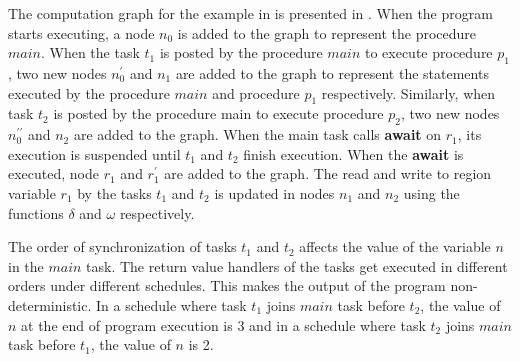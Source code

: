 The computation graph for the example in  is presented in . When the program starts executing, a node $n_0$ is added to the graph to represent the procedure $main$. When the task $t_1$ is posted by the procedure $main$ to execute procedure $p_1$, two new nodes $n_0^\prime$ and $n_1$ are added to the graph to represent the statements executed by the procedure $main$ and procedure $p_1$ respectively. Similarly, when task $t_2$ is posted by the procedure main to execute procedure $p_2$, two new nodes $n_0^{\prime\prime}$ and $n_2$ are added to the graph. When the main task calls \textbf{await} on $r_1$, its execution is suspended until $t_1$ and $t_2$ finish execution. When the \textbf{await} is executed, node $r_1$ and $r_1^\prime$ are added to the graph. The read and write to region variable $r_1$ by the tasks $t_1$ and $t_2$ is updated in nodes $n_1$ and $n_2$ using the functions $\delta$ and $\omega$ respectively.

The order of synchronization of tasks $t_1$ and $t_2$ affects the value of the variable $n$ in the $main$ task. The return value handlers of the tasks get executed in different orders under different schedules. This makes the output of the program non-deterministic. In a schedule where task $t_1$ joins $main$ task before $t_2$, the value of $n$ at the end of program execution is 3 and in a schedule where task $t_2$ joins $main$ task before $t_1$, the value of $n$ is 2.

